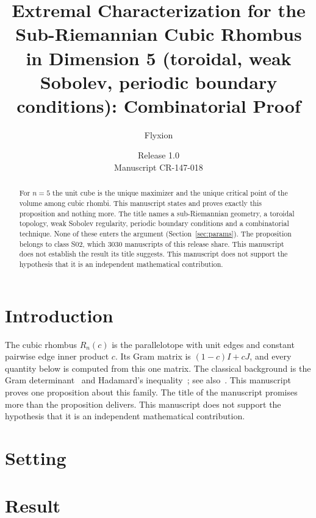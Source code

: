 \documentclass[11pt]{article}
\title{Extremal Characterization for the Sub-Riemannian Cubic Rhombus in Dimension 5 (toroidal, weak Sobolev, periodic boundary conditions): Combinatorial Proof}
\author{Flyxion}
\date{Release 1.0\\ Manuscript CR-147-018}
\begin{document}
\maketitle
\begin{abstract}
For $n=5$ the unit cube is the unique maximizer and the unique critical point of the volume among cubic rhombi. This manuscript states and proves exactly this proposition and nothing more. The title names a sub-Riemannian geometry, a toroidal topology, weak Sobolev regularity, periodic boundary conditions and a combinatorial technique. None of these enters the argument (Section~\ref{sec:params}). The proposition belongs to class S02, which 3030 manuscripts of this release share. This manuscript does not establish the result its title suggests. This manuscript does not support the hypothesis that it is an independent mathematical contribution.
\end{abstract}

\section{Introduction}
The cubic rhombus $R_n(c)$ is the parallelotope with unit edges and constant pairwise edge inner product $c$. Its Gram matrix is $(1-c)I+cJ$, and every quantity below is computed from this one matrix. The classical background is the Gram determinant~\cite{gram} and Hadamard's inequality~\cite{hadamard}; see also~\cite{hj}.
This manuscript proves one proposition about this family. The title of the manuscript promises more than the proposition delivers. This manuscript does not support the hypothesis that it is an independent mathematical contribution.

\section{Setting}


\section{Result}

\end{document}
